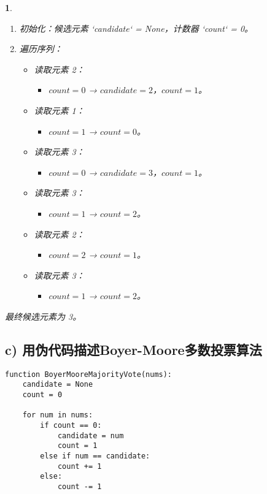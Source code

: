 \documentclass[UTF8]{report}
\theoremstyle{MyLineTheoremStyle} %
\theoremstyle{MyBlockTheoremStyle} %
\theoremstyle{MySubsubsectionStyle} %
\newtheorem{definition}{}
\begin{document}
\begin{definition}
\begin{enumerate}
    \item 初始化：候选元素 `candidate` = None，计数器 `count` = 0。
    \item 遍历序列：
    \begin{itemize}
        \item 读取元素 2：
        \begin{itemize}
            \item $count = 0$ → $candidate = 2$，$count = 1$。
        \end{itemize}
        \item 读取元素 1：
        \begin{itemize}
            \item $count = 1$ → $count = 0$。
        \end{itemize}
        \item 读取元素 3：
        \begin{itemize}
            \item $count = 0$ → $candidate = 3$，$count = 1$。
        \end{itemize}
        \item 读取元素 3：
        \begin{itemize}
            \item $count = 1$ → $count = 2$。
        \end{itemize}
        \item 读取元素 2：
        \begin{itemize}
            \item $count = 2$ → $count = 1$。
        \end{itemize}
        \item 读取元素 3：
        \begin{itemize}
            \item $count = 1$ → $count = 2$。
        \end{itemize}
    \end{itemize}
\end{enumerate}
最终候选元素为 3。

\subsection{c) 用伪代码描述Boyer-Moore多数投票算法}

\begin{verbatim}
function BoyerMooreMajorityVote(nums):
    candidate = None
    count = 0

    for num in nums:
        if count == 0:
            candidate = num
            count = 1
        else if num == candidate:
            count += 1
        else:
            count -= 1


\end{verbatim}
\end{definition}
\end{document}
